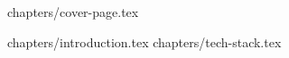 \documentclass[a4paper,12pt]{article}
\begin{document}
 
 
 
{chapters/cover-page.tex}

\tableofcontents
\clearpage

{chapters/introduction.tex}
{chapters/tech-stack.tex}
 
\end{document}
